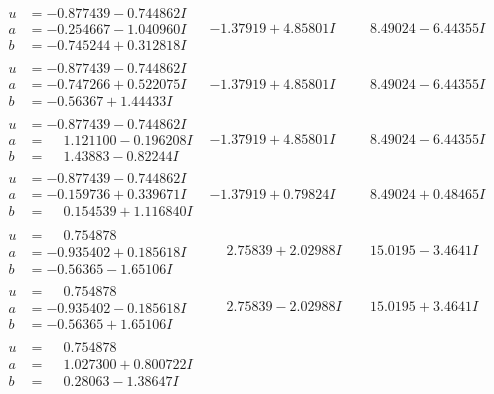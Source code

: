 \documentclass[1p]{elsarticle_modified}
\theoremstyle{definition}
\begin{document}
$$\begin{array}{c|c|c}
\begin{aligned}
u &= -0.877439 - 0.744862 I \\
a &= -0.254667 - 1.040960 I \\
b &= -0.745244 + 0.312818 I\end{aligned}
 & -1.37919 + 4.85801 I & \phantom{-}8.49024 - 6.44355 I \\ \hline\begin{aligned}
u &= -0.877439 - 0.744862 I \\
a &= -0.747266 + 0.522075 I \\
b &= -0.56367 + 1.44433 I\end{aligned}
 & -1.37919 + 4.85801 I & \phantom{-}8.49024 - 6.44355 I \\ \hline\begin{aligned}
u &= -0.877439 - 0.744862 I \\
a &= \phantom{-}1.121100 - 0.196208 I \\
b &= \phantom{-}1.43883 - 0.82244 I\end{aligned}
 & -1.37919 + 4.85801 I & \phantom{-}8.49024 - 6.44355 I \\ \hline\begin{aligned}
u &= -0.877439 - 0.744862 I \\
a &= -0.159736 + 0.339671 I \\
b &= \phantom{-}0.154539 + 1.116840 I\end{aligned}
 & -1.37919 + 0.79824 I & \phantom{-}8.49024 + 0.48465 I \\ \hline\begin{aligned}
u &= \phantom{-}0.754878\phantom{ +0.000000I} \\
a &= -0.935402 + 0.185618 I \\
b &= -0.56365 - 1.65106 I\end{aligned}
 & \phantom{-}2.75839 + 2.02988 I & \phantom{-}15.0195 - 3.4641 I \\ \hline\begin{aligned}
u &= \phantom{-}0.754878\phantom{ +0.000000I} \\
a &= -0.935402 - 0.185618 I \\
b &= -0.56365 + 1.65106 I\end{aligned}
 & \phantom{-}2.75839 - 2.02988 I & \phantom{-}15.0195 + 3.4641 I \\ \hline\begin{aligned}
u &= \phantom{-}0.754878\phantom{ +0.000000I} \\
a &= \phantom{-}1.027300 + 0.800722 I \\
b &= \phantom{-}0.28063 - 1.38647 I\end{aligned}

\end{array}$$
\end{document}
